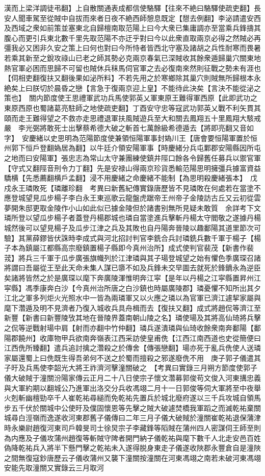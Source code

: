 漢而上梁洋調徒弔翻】上自散關通表成都信使駱驛【往來不絶曰駱驛使疏吏翻】長安人聞車駕至從賊中自拔而來者日夜不絶西師憩息既定【憇去例翻】李泌請遣安西及西域之衆如前策並塞東北自歸檀南取范陽上曰今大衆已集庸調亦至當乘兵鋒擣其腹心而更引兵東北數千里先取范陽不亦迂乎對曰今以此衆直取兩京必得之然賊必再彊我必又困非久安之策上曰何也對曰今所恃者皆西北守塞及諸胡之兵性耐寒而畏暑若乘其新至之銳攻祿山已老之師其勢必克兩京春氣已深賊收其餘衆遁歸巢穴關東地熱官軍必困而思歸不可留也賊休兵秣馬伺官軍之去必復南來然則征戰之勢未有涯也【伺相吏翻復扶又翻後果如泌所料】不若先用之於寒鄉除其巢穴則賊無所歸根本永絶矣上曰朕切於晨昏之戀【言急于復兩京迎上皇】不能待此決矣【言決不能從泌之策也】　關内節度使王思禮軍武功兵馬使郭英乂軍東原王難得軍西原【此即武功之東原西原也蜀諸葛亮駐師之地使疏吏翻】丁酉安守忠等寇武功郭英乂戰不利矢貫其頤而走王難得望之不救亦走思禮退軍扶風賊遊兵至大和關去鳳翔五十里鳳翔大駭戒嚴　李光弼將敢死士出擊蔡希德大破之斬首七萬餘級希德遁去【將即亮翻又音如字】　安慶緒以史思明為范陽節度使兼領恒陽軍事封媯川王【唐會要恒陽軍置於恒州郭下恒戶登翻媯居為翻】以牛廷介領安陽軍事【時慶緒分兵屯鄴郡安陽縣因所屯之地而曰安陽軍】張忠志為常山太守兼團練使鎮井陘口餘各令歸舊任募兵以禦官軍【守式又翻陘音刑令力丁翻】先是安禄山得兩京珍貨悉輸范陽思明擁彊兵據富資益驕横【先悉薦翻横戶孟翻】浸不用慶緒之命慶緒不能制【為思明殺慶緒張本】　戊戍永王璘敗死【璘離珍翻　考異曰新舊紀傳實錄唐歷皆不見璘敗在何處若在當塗不應登城望見瓜步楊子李白永王東巡歌云龍盤虎踞帝王州帝子金陵訪古丘又云初從雲夢開朱邸更取金陵作小山如此似已據金陵但於諸書别無所見疑未敢質　余詳考下文璘所登以望瓜步楊子者蓋登丹楊郡城也璘自當塗進兵擊斬丹楊太守閻敬之遂據丹楊城然後可以望見楊子及瓜步江津之兵及其敗也自丹陽奔晉陵以趣鄱陽其道里節次可驗】其黨薛鏐皆伏誅時李成式與河北招討判官李銑合兵討璘銑兵數千軍于楊子【楊子本為鎮屬江都縣高宗廢鎮置楊子縣即今真州治所】成式使判官裴茂【新書作裴茙】將兵三千軍于瓜步廣張旗幟列於江津璘與其子瑒登城望之始有懼色季廣琛召諸將謂曰吾屬從王至此天命未集人謀已隳不如及兵鋒未交早圖去就死於鋒鏑永為逆臣矣諸將皆然之於是廣琛以麾下奔廣陵渾惟明奔江寜【是年以丹楊之江寜縣置昇州江寜縣】馮季康奔白沙【今真州治所唐之白沙鎮也時屬廣陵郡】璘憂懼不知所出其夕江北之軍多列炬火光照水中一皆為兩璘軍又以火應之璘以為官軍已濟江遽挈家屬與麾下濳遁及明不見濟者乃復入城收兵具舟楫而去【復扶又翻】成式將趙侃等濟江至新豐【新書曰新豐陵攷其地在晉陵界蓋南朝山陵之名】璘使瑒及其將高仙琦將兵擊之侃等逆戰射瑒中肩【射而亦翻中竹仲翻】璘兵遂潰璘與仙琦收餘衆南奔鄱陽【鄱陽郡饒州】收庫物甲兵欲南奔嶺表江西采訪使皇甫侁【江西江南西道也史從簡便曰江西侁所臻翻】遣兵追討擒之濳殺之於傳舍【傳張戀翻】瑒亦死于亂兵侁使人送璘家屬還蜀上曰侁既生得吾弟何不送之於蜀而擅殺之邪遂廢侁不用　庚子郭子儀遣其子旴及兵馬使李韶光大將王祚濟河擊潼關破之　【考異曰實錄三月朔方節度使郭子儀大破賊于潼關汾陽家傳云正月二十八日使宗子懷文濳募郭俊苟文俊入河東搆忠義與大軍約期以翻城公乃進軍出洛交分兵收馮翊二月十一日郭俊等伺大軍將至中夜舉火剋斬幽檀勁卒千人崔乾祐尋縋而免乾祐先置兵於城北廢府遂以三千兵攻城自領馬步五千伏於關城中公使旴及僕固懷恩等先擊之賊大破遽焚橋我軍蹈之而滅乾祐棄關城尋白涇嶺而逸遂收河東郡舊子儀傳曰二年三月子儀大破賊於潼關崔乾祐退保蒲津時永樂尉趙復河東司戶韓旻司士徐炅宗子李藏鋒等䧟賊在蒲州四人密謀伺王師至則為内應及子儀攻蒲州趙復等斬賊守陴者開門納子儀乾祐與麾下數千人北走安邑百姓偽降乾祐兵入將半下懸門擊之乾祐未入遂得脱身東走子儀遂收陜郡永豐倉自是潼陜之間無復寇鈔唐歷云子儀收蒲州又襲下潼關按潼關在河東馮翊之南若未破河東馮翊安能先取潼關又實錄云三月取河